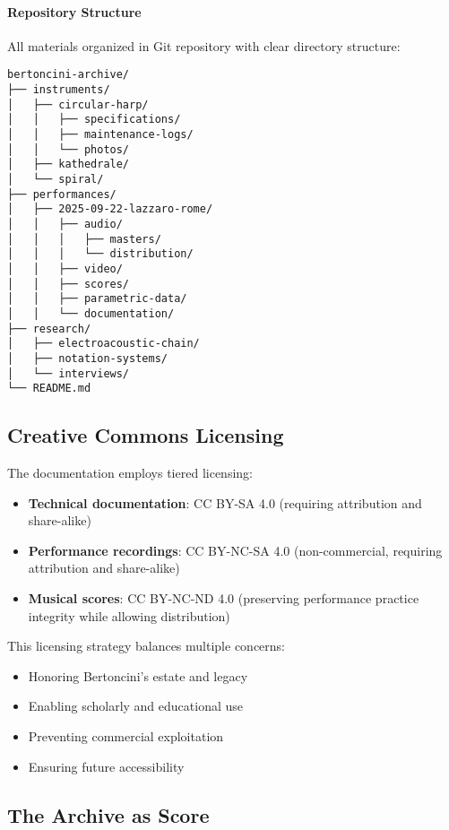 \paragraph{Repository Structure}
All materials organized in Git repository with clear directory structure:

\begin{verbatim}
bertoncini-archive/
├── instruments/
│   ├── circular-harp/
│   │   ├── specifications/
│   │   ├── maintenance-logs/
│   │   └── photos/
│   ├── kathedrale/
│   └── spiral/
├── performances/
│   ├── 2025-09-22-lazzaro-rome/
│   │   ├── audio/
│   │   │   ├── masters/
│   │   │   └── distribution/
│   │   ├── video/
│   │   ├── scores/
│   │   ├── parametric-data/
│   │   └── documentation/
├── research/
│   ├── electroacoustic-chain/
│   ├── notation-systems/
│   └── interviews/
└── README.md
\end{verbatim}

\subsection{Creative Commons Licensing}

The documentation employs tiered licensing:
\begin{itemize}
  \item \textbf{Technical documentation}: CC BY-SA 4.0 (requiring attribution 
  and share-alike)
  \item \textbf{Performance recordings}: CC BY-NC-SA 4.0 (non-commercial, 
  requiring attribution and share-alike)
  \item \textbf{Musical scores}: CC BY-NC-ND 4.0 (preserving performance 
  practice integrity while allowing distribution)
\end{itemize}

This licensing strategy balances multiple concerns:
\begin{itemize}
  \item Honoring Bertoncini's estate and legacy
  \item Enabling scholarly and educational use
  \item Preventing commercial exploitation
  \item Ensuring future accessibility
\end{itemize}

\subsection{The Archive as Score}

